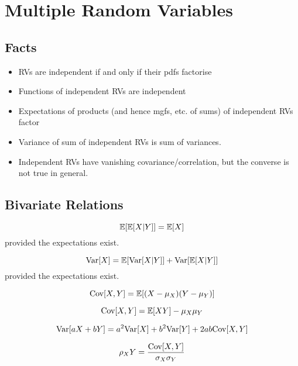 \section{Multiple Random Variables}

\subsection{Facts}
\begin{itemize}[+]
    \item RVs are independent if and only if their pdfs factorise
    \item Functions of independent RVs are independent
    \item Expectations of products (and hence mgfs, etc. of sums) of independent RVs factor
    \item Variance of sum of independent RVs is sum of variances.
    \item Independent RVs have vanishing covariance/correlation, but the converse is not true in general.
\end{itemize}

\subsection{Bivariate Relations}
\begin{theorem}
    \[
        \mathbb{E}{}[\mathbb{E}{}[X|Y]] = \mathbb{E}{}[X]
    \]
    provided the expectations exist.
\end{theorem}

\begin{theorem}
    \[
        \text{Var}{}[X] = \mathbb{E}{}[\text{Var}{}[X \vert{} Y]] + \text{Var}{}[\mathbb{E}{}[X \vert{} Y]]
    \]
    provided the expectations exist.
\end{theorem}

\begin{definition}[Covariance]
    \[
        \text{Cov}{}[X, Y] = \mathbb{E}{}[(X - \mu_X)(Y - \mu_Y)]
    \]
\end{definition}

\begin{theorem}
    \[
        \text{Cov}{}[X, Y] = \mathbb{E}{}[XY] - \mu_X\mu_Y
    \]
\end{theorem}

\begin{theorem}
    \[
        \text{Var}[aX + bY] = a^2\text{Var}{}[X] + b^2\text{Var}{}[Y] + 2ab\text{Cov}[X, Y]
    \]
\end{theorem}

\begin{definition}[Correlation]
    \[
        \rho_XY = \frac{\text{Cov}[X, Y]}{\sigma_X \sigma_Y}
    \]
\end{definition}

